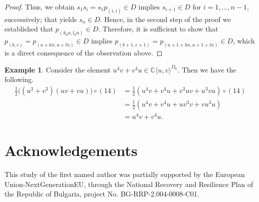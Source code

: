 \documentclass{amsart}[12pt]
\theoremstyle{definition}
\newtheorem{example}[theorem]{Example}
\newcommand{\C}{{\mathbb{C}}}
\newcommand{\Cuv}{\C \langle u,v\rangle}
\begin{document}
\begin{proof}
\noindent Thus, we obtain $s_1s_i=s_1p_{(i,i)}\in D$ implies $s_{i+1}\in D$ for $i=1,\ldots,n-1$, successively;
that yields $s_n\in D$. Hence, in the second step of the proof we established that $p_{(k_0n,l_0n)}\in D$.
Therefore, it is sufficient to show that $p_{(b,c)}=p_{(a+kn,a+ln)}\in D$ implies $p_{(b+1,c+1)}=p_{(a+1+kn,a+1+ln)}\in D$,
which is a direct consequence of the observation above.

\end{proof}


\begin{example}
	Consider the element $u^4v+v^4u\in\Cuv^{D_{6}}$. Then we have the following.
	\begin{align}
		\frac{1}{2}\big((u^3+v^3)(uv+vu)\big)\circ(14)&=\frac{1}{2}(u^4v+v^4u+v^3uv+u^3vu)\circ(14)\nonumber\\
		&=\frac{1}{2}(u^4v+v^4u+uv^3v+vu^3u)\nonumber\\
		&=u^4v+v^4u.\nonumber
	\end{align}
\end{example}

\section*{Acknowledgements}


This study of the first named author was partially supported  by the European Union-NextGenerationEU,
through the National Recovery and Resilience Plan of the Republic of Bulgaria, project No. BG-RRP-2.004-0008-C01.
\end{document}
